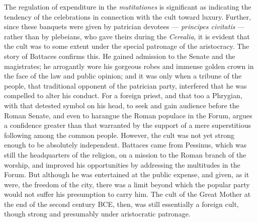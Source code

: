 \documentclass[a4paper, 11pt, oneside, polutonikogreek, french]{article}
\begin{document}
The regulation of expenditure in the \emph{mutitationes} is significant as indicating the tendency of the celebrations in connection with the cult toward luxury. Further, since these banquets were given by patrician devotees --- \emph{principes civitatis} --- rather than by plebeians, who gave theirs during the \emph{Cerealia}, it is evident that the cult was to some extent under the special patronage of the aristocracy. The story of Battaces confirms this. He gained admission to the Senate and the magistrates; he arrogantly wore his gorgeous robes and immense golden crown in the face of the law and public opinion; and it was only when a tribune of the people, that traditional opponent of the patrician party, interfered that he was compelled to alter his conduct. For a foreign priest, and that too a Phrygian, with that detested symbol on his head, to seek and gain audience before the Roman Senate, and even to harangue the Roman populace in the Forum, argues a confidence greater than that warranted by the support of a mere superstitious following among the common people. However, the cult was not yet strong enough to be absolutely independent. Battaces came from Pessinus, which was still the headquarters of the religion, on a mission to the Roman branch of the worship, and improved his opportunities by addressing the multitudes in the Forum. But although he was entertained at the public expense, and given, as it were, the freedom of the city, there was a limit beyond which the popular party would not suffer his presumption to carry him. The cult of the Great Mother at the end of the second century \textsc{BCE}, then, was still essentially a foreign cult, though strong and presumably under aristocratic patronage.
\end{document}
